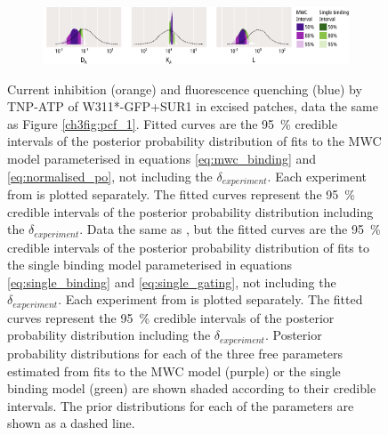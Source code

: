 \begin{figure}[h]
\begin{subfigure}[t]{0.45\textwidth}
	\end{subfigure}
	\vfill
	\begin{subfigure}[t]{0.9\textwidth}
		\caption{}\label{ch4fig:w311_mwc_fit_3}
		\centering
		\includegraphics[width=\textwidth]{w311_mwc_fit_3.pdf}
	\end{subfigure}
	\caption[A concerted model explains the data better than an independent model]{
	 Current inhibition (orange) and fluorescence quenching (blue) by TNP-ATP of W311*-GFP+SUR1 in excised patches, data the same as Figure \ref{ch3fig:pcf_1}.
	Fitted curves are the \SI{95}{\percent} credible intervals of the posterior probability distribution of fits to the MWC model parameterised in equations \ref{eq:mwc_binding} and \ref{eq:normalised_po}, not including the $\delta_{experiment}$.
	 Each experiment from  is plotted separately.
	The fitted curves represent the \SI{95}{\percent} credible intervals of the posterior probability distribution including the $\delta_{experiment}$.
	 Data the same as , but the fitted curves are the \SI{95}{\percent} credible intervals of the posterior probability distribution of fits to the single binding model parameterised in equations \ref{eq:single_binding} and \ref{eq:single_gating}, not including the $\delta_{experiment}$.
	 Each experiment from  is plotted separately.
	The fitted curves represent the \SI{95}{\percent} credible intervals of the posterior probability distribution including the $\delta_{experiment}$.
	 Posterior probability distributions for each of the three free parameters estimated from fits to the MWC model (purple) or the single binding model (green) are shown shaded according to their credible intervals.
	The prior distributions for each of the parameters are shown as a dashed line.
	}\label{ch4fig:w311_model_comparison_1}
\end{figure}


